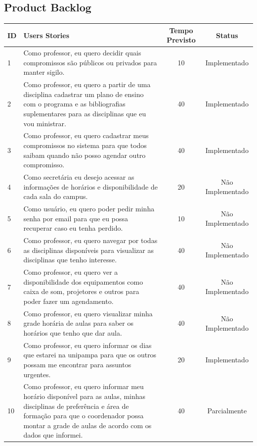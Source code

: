 \documentclass{abnt}
\begin{document}
	
	\begin{landscape}
\chapter{Product Backlog}

		\begin{longtable}{|p{0.5in}|p{6in}|c|c|}
		\hline
		  {\bf ID} & {\bf Users Stories} & {\bf Tempo Previsto} & {\bf Status} \\
		\hline
		         1 & Como professor, eu quero decidir quais compromissos são públicos ou privados para manter sigilo. &         10 & Implementado \\
		\hline
		         2 & Como professor, eu quero a partir de uma disciplina cadastrar um plano de ensino com o programa e as bibliografias suplementares para as disciplinas que eu vou ministrar. &         40 & Implementado \\
		\hline
		         3 & Como professor, eu quero cadastrar meus compromissos no sistema para que todos saibam quando não posso agendar outro compromisso. &         40 & Implementado \\
		\hline
		         4 & Como secretária eu desejo acessar as informações de horários e disponibilidade de cada sala do campus.  &         20 & Não Implementado \\
		\hline
		         5 & Como usuário, eu quero poder pedir minha senha por email para que eu possa recuperar caso eu tenha perdido. &         10 & Não Implementado \\
		\hline
		         6 & Como professor, eu quero navegar por todas as disciplinas disponíveis para visualizar as disciplinas que tenho interesse.  &         40 & Não Implementado \\
		\hline
		         7 & Como professor, eu quero ver a disponibilidade dos equipamentos como caixa de som, projetores e outros para poder fazer um agendamento. &         40 & Não Implementado \\
		\hline
		         8 & Como professor, eu quero visualizar minha grade horária de aulas para saber os horários que tenho que dar aula. &         40 & Não Implementado \\
		\hline
		         9 & Como professor, eu quero informar os dias que estarei na unipampa para que os outros possam me encontrar para assuntos urgentes.  &         20 & Implementado \\
		\hline
		        10 & Como professor, eu quero informar meu horário disponível para as aulas, minhas disciplinas de preferência e área de formação para que o coordenador possa montar a grade de aulas de acordo com os dados que informei. &         40 & Parcialmente \\
		\hline
	

\end{longtable}
\end{landscape}
\end{document}
